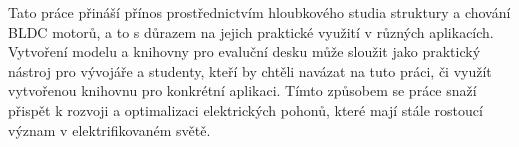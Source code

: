 Tato práce přináší přínos prostřednictvím hloubkového studia struktury a chování BLDC motorů, a to s důrazem na jejich praktické 
využití v různých aplikacích. Vytvoření modelu a knihovny pro evaluční desku může sloužit jako praktický nástroj pro vývojáře a studenty, kteří
by chtěli navázat na tuto práci, či využít vytvořenou knihovnu pro konkrétní aplikaci. Tímto způsobem se práce snaží přispět k rozvoji a optimalizaci elektrických 
pohonů, které mají stále rostoucí význam v elektrifikovaném světě.




